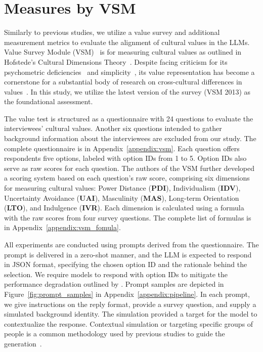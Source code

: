 \documentclass[11pt]{article}
\begin{document}
\section{Measures by VSM}
\label{sec:measures}

Similarly to previous studies, we utilize a value survey and additional measurement metrics to evaluate the alignment of cultural values in the LLMs. Value Survey Module (VSM)~\cite{vsm2013-jj} is for measuring cultural values as outlined in Hofstede's Cultural Dimensions Theory~\cite{Gerlach2021-ww}. Despite facing criticism for its psychometric deficiencies~\cite{TARAS2023101386} and simplicity~\cite{Ercan1991-dk}, its value representation has become a cornerstone for a substantial body of research on cross-cultural differences in values~\cite{arora2023probing}. In this study, we utilize the latest version of the survey (VSM 2013) as the foundational assessment.

The value test is structured as a questionnaire with 24 questions to evaluate the interviewees' cultural values. Another six questions intended to gather background information about the interviewees are excluded from our study. The complete questionnaire is in Appendix~\ref{appendix:vsm}. Each question offers respondents five options, labeled with option IDs from 1 to 5. Option IDs also serve as raw scores for each question. The authors of the VSM further developed a scoring system based on each question's raw score, comprising six dimensions for measuring cultural values: Power Distance (\textbf{PDI}), Individualism (\textbf{IDV}), Uncertainty Avoidance (\textbf{UAI}), Masculinity (\textbf{MAS}), Long-term Orientation (\textbf{LTO}), and Indulgence (\textbf{IVR}). Each dimension is calculated using a formula with the raw scores from four survey questions. The complete list of formulas is in Appendix~\ref{appendix:vsm_fomula}.

All experiments are conducted using prompts derived from the questionnaire. The prompt is delivered in a zero-shot manner, and the LLM is expected to respond in JSON format, specifying the chosen option ID and the rationale behind the selection. We require models to respond with option IDs to mitigate the performance degradation outlined by \citet{zheng2024large}. Prompt samples are depicted in Figure~\ref{fig:prompt_samples} in Appendix~\ref{appendix:pipeline}. In each prompt, we give instructions on the reply format, provide a survey question, and supply a simulated background identity. The simulation provided a target for the model to contextualize the response. Contextual simulation or targeting specific groups of people is a common methodology used by previous studies to guide the generation~\cite{kovač2023large, narayanan-venkit-etal-2023-nationality, ramezani2023knowledge, cheng2023marked}.
\end{document}
